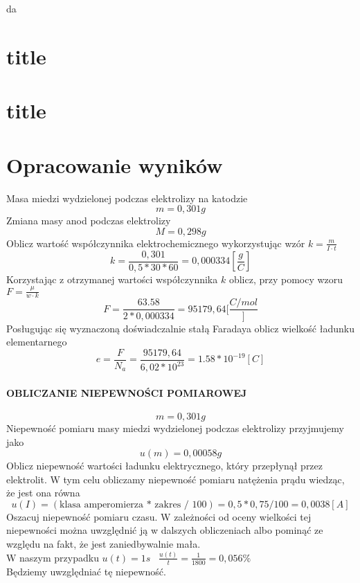 \documentclass[a4paper,10pt,twoside]{article}
\begin{document}
	
\section{}
da
\newpage
\section{title}
\newpage
\section{title}
\newpage
\section{Opracowanie wyników}
\noindent
Masa miedzi wydzielonej podczas elektrolizy na katodzie
$$m = 0,301g$$
Zmiana masy anod podczas elektrolizy
$$M = 0,298g$$
Oblicz wartość współczynnika elektrochemicznego wykorzystując wzór $k = \frac{m}{I\cdot t}$
$$k = \frac{0,301}{0,5*30*60}=0,000334[\frac{g}{C}]$$
Korzystając z otrzymanej wartości współczynnika $k$ oblicz, przy pomocy wzoru $F = \frac{\mu}{w\cdot k}$
$$F=\frac{63.58}{2*0,000334} = 95179,64[\frac{C/mol}]$$
Posługując się wyznaczoną doświadczalnie stałą Faradaya oblicz wielkość ładunku elementarnego
$$e = \frac{F}{N_a} = \frac{95179,64}{6,02*10^{23}} = 1.58*10^{-19}[C]$$

\paragraph*{OBLICZANIE NIEPEWNOŚCI POMIAROWEJ}
\noindent
\newline
$$m = 0,301g$$
Niepewność pomiaru masy miedzi wydzielonej podczas elektrolizy przyjmujemy jako\\
$$u(m) = 0,00058g$$
Oblicz niepewność wartości ładunku elektrycznego, który przepłynął przez elektrolit. W tym celu obliczamy niepewność pomiaru natężenia prądu wiedząc, że jest ona równa 
$$u(I) = (\text{klasa amperomierza * zakres / 100}) = 0,5 * 0,75 / 100 = 0,0038[A]$$
Oszacuj niepewność pomiaru czasu. W zależności od oceny wielkości tej niepewności można uwzględnić ją w dalszych obliczeniach albo pominąć ze względu na fakt, że jest zaniedbywalnie mała. 
\\W naszym przypadku $u(t) = 1s \hspace{10pt} \frac{u(t)}{t} = \frac{1}{1800} = 0,056\%$\\
Będziemy uwzględniać tę niepewność.
\end{document}
